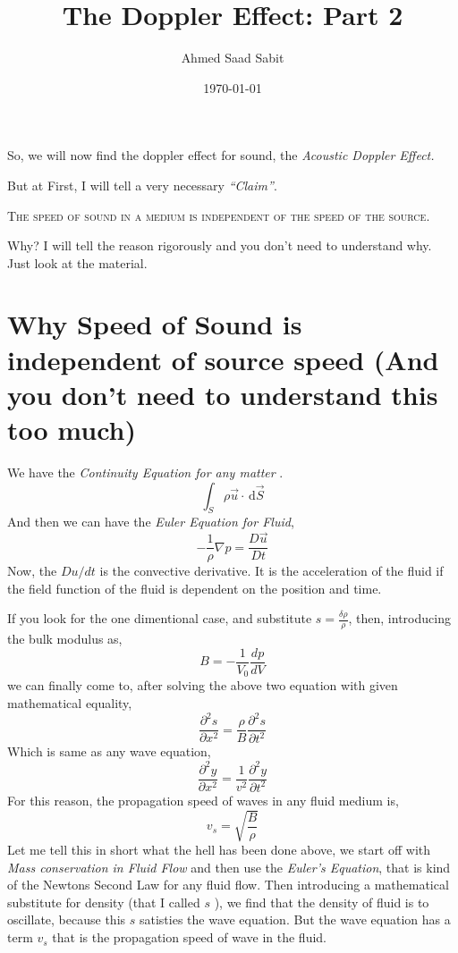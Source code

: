 \documentclass[a4paper]{article}
\title{The Doppler Effect: Part 2}
\author{Ahmed Saad Sabit }
\date{\today}
\begin{document}
    \maketitle
So, we will now find the doppler effect for sound, the \emph{Acoustic Doppler Effect. }

But at First, I will tell a very necessary \emph{``Claim''}. 
\begin{center}
    \textsc{The speed of sound in a medium is independent of the speed of the source.}
\end{center}
Why? I will tell the reason rigorously and you don't need to understand why. Just look at the material. 
\section{Why Speed of Sound is independent of source speed (And you don't need to understand this too much)}
We have the \emph{Continuity Equation for any matter }. 
\begin{equation}
\int_{S}^{}          \rho \vec{u} \cdot       \, 
\mathrm{d} \vec{S}
\end{equation} 
And then we can have the \emph{Euler Equation for Fluid}, 
\begin{equation}
- \frac{1}{\rho} \nabla p = \frac{ D \vec{u} }{ Dt } 
\end{equation} 
Now, the $Du/dt$ is the convective derivative. It is the acceleration of the fluid if the field function of the 
fluid is dependent on the position and time. 

If you look for the one dimentional case, and substitute $s = \frac{ \delta \rho }{ \rho }$, then, introducing the bulk modulus as, 
\[ B = - \frac{1}{V_0} \frac{ dp }{ dV }\]
we can finally come to, after solving the above two equation with given mathematical equality, 
\begin{equation}
\frac{\partial ^2 s}{\partial x^2 }= \frac{ \rho }{ B } \frac{\partial ^2 s}{\partial t^2} 
\end{equation}  
Which is same as any wave equation, 
\begin{equation}
\frac{\partial ^2 y}{\partial x ^2 } = \frac{1}{v^2} \frac{\partial ^2 y}{\partial t^2}
\end{equation} 
For this reason, the propagation speed of waves in any fluid medium is, 
\begin{equation}
v_s = \sqrt{\frac{ B }{ \rho }} 
\end{equation} 
Let me tell this in short what the hell has been done above, we start off with \emph{Mass conservation in Fluid Flow}
and then use the \emph{Euler's Equation}, that is kind of the Newtons Second Law for any fluid flow. Then introducing 
a mathematical substitute for density (that I called $s$ ), we find that the density of fluid is to oscillate, because this 
$s$ satisties the wave equation. But the wave equation has a term $v_s$ that is the propagation speed of wave in the fluid. 
\end{document}
